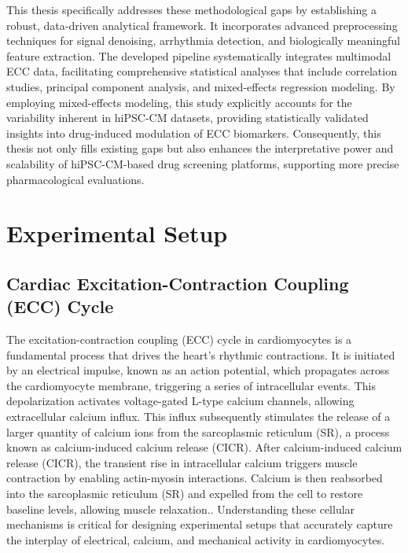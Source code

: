 \documentclass{report}
\begin{document}
    This thesis specifically addresses these methodological gaps by establishing a robust, data-driven analytical framework. It incorporates advanced preprocessing techniques for signal denoising, arrhythmia detection, and biologically meaningful feature extraction. The developed pipeline systematically integrates multimodal ECC data, facilitating comprehensive statistical analyses that include correlation studies, principal component analysis, and mixed-effects regression modeling. By employing mixed-effects modeling, this study explicitly accounts for the variability inherent in hiPSC-CM datasets, providing statistically validated insights into drug-induced modulation of ECC biomarkers. Consequently, this thesis not only fills existing gaps but also enhances the interpretative power and scalability of hiPSC-CM-based drug screening platforms, supporting more precise pharmacological evaluations.
    
        
    
    
\chapter{Experimental Setup}
    
      \section{Cardiac Excitation-Contraction Coupling (ECC) Cycle}
            The excitation-contraction coupling (ECC) cycle in cardiomyocytes is a fundamental process that drives the heart's rhythmic contractions. It is initiated by an electrical impulse, known as an action potential, which propagates across the cardiomyocyte membrane, triggering a series of intracellular events. This depolarization activates voltage-gated L-type calcium channels, allowing extracellular calcium influx. This influx subsequently stimulates the release of a larger quantity of calcium ions from the sarcoplasmic reticulum (SR), a process known as calcium-induced calcium release (CICR). After calcium-induced calcium release (CICR), the transient rise in intracellular calcium triggers muscle contraction by enabling actin-myosin interactions. Calcium is then reabsorbed into the sarcoplasmic reticulum (SR) and expelled from the cell to restore baseline levels, allowing muscle relaxation.\cite{2002cardiac}. Understanding these cellular mechanisms is critical for designing experimental setups that accurately capture the interplay of electrical, calcium, and mechanical activity in cardiomyocytes.
                
\end{document}
